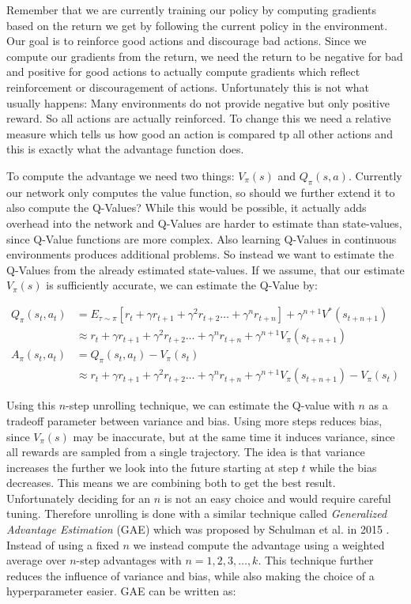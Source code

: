 Remember that we are currently training our policy by computing gradients based on the return we get by following the current policy in the environment. Our goal is to reinforce good actions and discourage bad actions. Since we compute our gradients from the return, we need the return to be negative for bad and positive for good actions to actually compute gradients which reflect reinforcement or discouragement of actions. Unfortunately this is not what usually happens: Many environments do not provide negative but only positive reward. So all actions are actually reinforced. To change this we need a relative measure which tells us how good an action is compared tp all other actions and this is exactly what the advantage function does. 

To compute the advantage we need two things: $V_\pi(s)$ and $Q_\pi(s, a)$. Currently our network only computes the value function, so should we further extend it to also compute the Q-Values? While this would be possible, it actually adds overhead into the network and Q-Values are harder to estimate than state-values, since Q-Value functions are more complex. Also learning Q-Values in continuous environments produces additional problems. So instead we want to estimate the Q-Values from the already estimated state-values. If we assume, that our estimate $V_\pi(s)$ is sufficiently accurate, we can estimate the Q-Value by:

\begin{align*}
Q_\pi(s_t, a_t) &= E_{\tau\sim\pi}\left[r_t + \gamma r_{t+1} + \gamma^2 r_{t+2} \dots + \gamma^n r_{t+n}\right] + \gamma^{n+1}V^*(s_{t+n+1}) \\
&\approx r_t + \gamma r_{t+1} + \gamma^2 r_{t+2} \dots + \gamma^n r_{t+n} + \gamma^{n+1}V_\pi(s_{t+n+1}) \\[15pt]
A_\pi(s_t, a_t) &= Q_\pi(s_t, a_t) - V_\pi(s_t) \\
&\approx r_t + \gamma r_{t+1} + \gamma^2 r_{t+2} \dots + \gamma^n r_{t+n} + \gamma^{n+1}V_\pi(s_{t+n+1}) - V_\pi(s_t)
\end{align*}

Using this $n$-step unrolling technique, we can estimate the Q-value with $n$ as a tradeoff parameter between variance and bias. Using more steps reduces bias, since $V_\pi(s)$ may be inaccurate, but at the same time it induces variance, since all rewards are sampled from a single trajectory. The idea is that variance increases the further we look into the future starting at step $t$ while the bias decreases. This means we are combining both to get the best result. Unfortunately deciding for an $n$ is not an easy choice and would require careful tuning. Therefore unrolling is done with a similar technique called \textit{Generalized Advantage Estimation} (GAE) which was proposed by Schulman et al. in 2015 \cite{schulman2015high}. Instead of using a fixed $n$ we instead compute the advantage using a weighted average over $n$-step advantages with $n = 1, 2, 3, \dots, k$. This technique further reduces the influence of variance and bias, while also making the choice of a hyperparameter easier. GAE can be written as:

